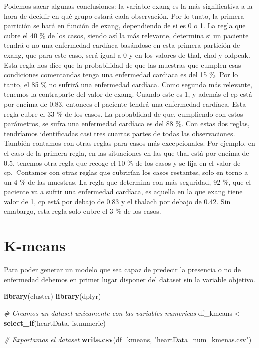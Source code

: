 \documentclass[
]{article}
\newenvironment{Shaded}{\begin{snugshade}}{\end{snugshade}}
\newcommand{\CommentTok}[1]{\textcolor[rgb]{0.56,0.35,0.01}{\textit{#1}}}
\newcommand{\KeywordTok}[1]{\textcolor[rgb]{0.13,0.29,0.53}{\textbf{#1}}}
\newcommand{\NormalTok}[1]{#1}
\newcommand{\StringTok}[1]{\textcolor[rgb]{0.31,0.60,0.02}{#1}}
\begin{document}
Podemos sacar algunas conclusiones: la variable exang es la más
significativa a la hora de decidir en qué grupo estará cada observación.
Por lo tnato, la primera partición se hará en función de exang,
dependiendo de si es 0 o 1. La regla que cubre el 40 \% de los casos,
siendo así la más relevante, determina si un paciente tendrá o no una
enfermedad cardíaca basándose en esta primera partición de exang, que
para este caso, será igual a 0 y en los valores de thal, chol y oldpeak.
Esta regla nos dice que la probabilidad de que las muestras que cumplen
esas condiciones comentandas tenga una enfermedad cardiaca es del 15 \%.
Por lo tanto, el 85 \% no sufrirá una enfermedad cardíaca. Como segunda
más relevante, tenemos la contraparte del valor de exang. Cuando este es
1, y además el cp está por encima de 0.83, entonces el paciente tendrá
una enfermedad cardíaca. Esta regla cubre el 33 \% de los casos. La
probablidad de que, cumpliendo con estos parámetros, se sufra una
enfermedad cardíaca es del 88 \%. Con estas dos reglas, tendríamos
identificadas casi tres cuartas partes de todas las observaciones.
También contamos con otras reglas para casos más excepcionales. Por
ejemplo, en el caso de la primera regla, en las situaciones en las que
thal está por encima de 0.5, tenemos otra regla que recoge el 10 \% de
los casos y se fija en el valor de cp.~Contamos con otras reglas que
cubrirían los casos restantes, solo en torno a un 4 \% de las muestras.
La regla que determina con más seguridad, 92 \%, que el paciente va a
sufrir una enfermedad cardíaca, es aquella en la que exang tiene valor
de 1, cp está por debajo de 0.83 y el thalach por debajo de 0.42. Sin
emabargo, esta regla solo cubre el 3 \% de los casos.

\hypertarget{k-means}{%
\section{K-means}\label{k-means}}

Para poder generar un modelo que sea capaz de predecir la presencia o no
de enfermedad debemos en primer lugar disponer del dataset sin la
variable objetivo.

\begin{Shaded}
\begin{Highlighting}[]
\KeywordTok{library}\NormalTok{(cluster)}
\KeywordTok{library}\NormalTok{(dplyr)}

\CommentTok{# Creamos un dataset unicamente con las variables numericas}
\NormalTok{df_kmeans <-}\StringTok{ }\KeywordTok{select_if}\NormalTok{(heartData, is.numeric)}

\CommentTok{# Exportamos el dataset}
\KeywordTok{write.csv}\NormalTok{(df_kmeans, }\StringTok{"heartData_num_kmenas.csv"}\NormalTok{)}
\end{Highlighting}
\end{Shaded}
\end{document}
